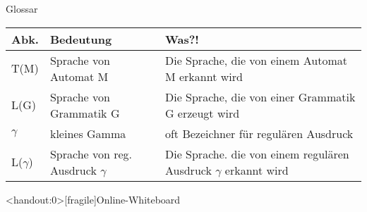 \begin{frame}[fragile]{Glossar}
  \small
  \begin{tabular}{p{} p{} p{}}
    \toprule
    Abk.        & Bedeutung                          & Was?!                                                               \\
    \midrule
    T(M)        & Sprache von Automat M              & Die Sprache, die von einem Automat M erkannt wird                   \\
    L(G)        & Sprache von Grammatik G            & Die Sprache, die von einer Grammatik G erzeugt wird                 \\
    $\gamma$    & kleines Gamma                      & oft Bezeichner für regulären Ausdruck                               \\
    L($\gamma$) & Sprache von reg. Ausdruck $\gamma$ & Die Sprache. die von einem regulären Ausdruck $\gamma$ erkannt wird \\
    \bottomrule
  \end{tabular}
\end{frame}

\appendix
\begin{frame}<handout:0>[fragile]{Online-Whiteboard}
  \phantom{text}
\end{frame}


